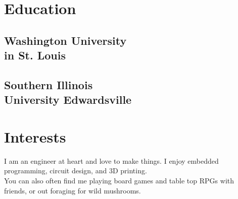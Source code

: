 \documentclass[]{deedy-resume-openfont}
\begin{document}
\begin{minipage}[t]{0.31\textwidth}

\section{Education} 
\subsection{Washington University \\in St. Louis} 
\vspace{0.1cm}
\sectionsep

\subsection{Southern Illinois \\University Edwardsville}
\vspace{0.1cm}
\sectionsep
{}
\sectionsep


\section{Interests}
I am an engineer at heart and love to make things. I enjoy embedded programming, circuit design, and 3D printing.\\
\sectionsep
You can also often find me playing board games and table top RPGs with friends, or out foraging for wild mushrooms.



%
%

\end{minipage} 
\hfill
\end{document}
